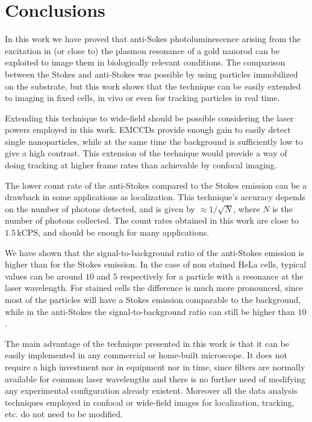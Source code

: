 \documentclass[journal=nalefd,manuscript=letter]{achemso}
\begin{document}
\section{Conclusions}
In this work we have proved that anti-Sokes photoluminescence arising from the
excitation in (or close to) the plasmon resonance of a gold nanorod can be
exploited to image\cite{Jiang2013} them in biologically relevant conditions. The
comparison between the Stokes and anti-Stokes was possible by using particles
immobilized on the substrate, but this work shows that the technique can be
easily extended to imaging in fixed cells, in vivo or even for tracking
particles in real time\cite{VandenBroek2013}.

Extending this technique to wide-field should be possible considering the laser
powers employed in this work. EMCCDs provide enough gain\cite{Dussault2004} to
easily detect single nanoparticles, while at the same time the background is
sufficiently low to give a high contrast. This extension of the technique would
provide a way of doing tracking at higher frame rates than achievable by
confocal imaging.

The lower count rate of the anti-Stokes compared to the Stokes emission can be a
drawback in some applications as localization\cite{Sahl2013}. This technique's
accuracy depends on the number of photons detected, and is given by $\approx
1/\sqrt{N}$, where $N$ is the number of photons collected. The count rates
obtained in this work are close to $1.5\,\textrm{kCPS}$, and should be enough
for many applications. 

We have shown that the signal-to-background ratio of the anti-Stokes emission is
higher than for the Stokes emission. In the case of non stained HeLa cells,
typical values can be around $10$ and $5$ respectively for a particle with a
resonance at the laser wavelength. For stained cells the difference is
much more pronounced, since most of the particles will have a Stokes emission
comparable to the background, while in the anti-Stokes the signal-to-background
ratio can still be higher than $10$.

The main advantage of the technique presented in this work is that it can be
easily implemented in any commercial or home-built microscope. It does not
require a high investment nor in equipment nor in time, since filters are
normally available for common laser wavelengths and there is no further need of
modifying any experimental configuration already existent. Moreover all the data
analysis techniques employed in confocal or wide-field images for localization,
tracking, etc. do not need to be modified. 

{}
\end{document}
